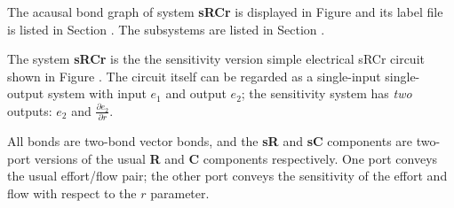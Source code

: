 

   The acausal bond graph of system \textbf{sRCr} is
   displayed in Figure  and its label
   file is listed in Section .
   The subsystems are listed in Section .

The system \textbf{sRCr} is the the sensitivity version simple
electrical sRCr circuit shown in Figure . The circuit itself can be
regarded as a single-input single-output system with input $e_1$ and
output $e_2$; the sensitivity system has {\em two\/} outputs: $e_2$
and $\frac{\partial e_2}{\partial r}$.

All bonds are two-bond vector bonds, and the {\bf sR} and {\bf sC}
components are two-port versions of the usual {\bf R} and {\bf C}
components respectively. One port conveys the usual effort/flow pair;
the other port conveys the sensitivity of the effort and flow with
respect to the $r$ parameter.

